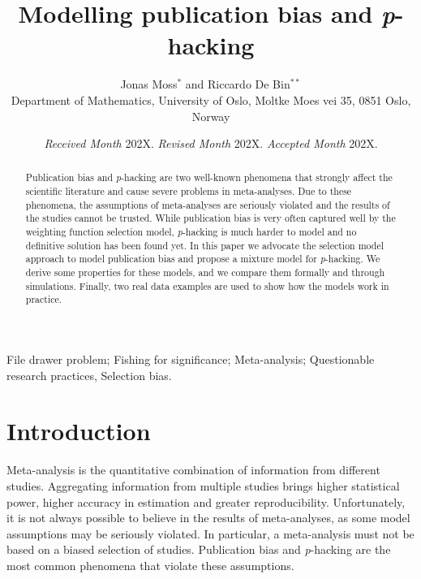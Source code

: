 \documentclass[useAMS,usenatbib,referee]{biom}
\author{Jonas Moss$^{*}$\email{jonasmgj@math.uio.no} and
Riccardo De Bin$^{**}$\email{debin@math.uio.no}\\
Department of Mathematics, University of Oslo, Moltke Moes vei 35, 0851 Oslo, Norway}
\title[Modelling publication bias and \textit{p}-hacking]{Modelling publication bias and \textit{p}-hacking}
\begin{document}
\date{{\it Received Month} 202X. {\it Revised Month} 202X.  {\it Accepted Month} 202X.}

\pagerange{\pageref{firstpage}--\pageref{lastpage}} 


\label{firstpage}

\begin{abstract}
Publication bias and \textit{p}-hacking are two well-known phenomena that strongly affect the scientific literature and cause severe problems in meta-analyses. Due to these phenomena, the assumptions of meta-analyses are seriously violated and the results of the studies cannot be trusted. While publication bias is very often captured well by the weighting function selection model, \textit{p}-hacking is much harder to model and no definitive solution has been found yet. In this paper we advocate the selection model approach to model publication bias and propose a mixture model for \textit{p}-hacking. We derive some properties for these models, and we compare them formally and through simulations. Finally, two real data examples are used to show how the models work in practice.
\end{abstract}

\begin{keywords}
File drawer problem; Fishing for significance; Meta-analysis; Questionable research practices, Selection bias.
\end{keywords}

\maketitle

\section{Introduction}

Meta-analysis is the quantitative combination of information from different studies. Aggregating information from multiple studies brings higher statistical power, higher accuracy in estimation and greater reproducibility. Unfortunately, it is not always possible to believe in the results of meta-analyses, as some model assumptions may be seriously violated. In particular, a meta-analysis must not be based on a biased selection of studies. Publication bias \citep{sterling1959publication} and \textit{p}-hacking \citep{simmons2011false} are the most common phenomena that violate these assumptions. 
\end{document}
